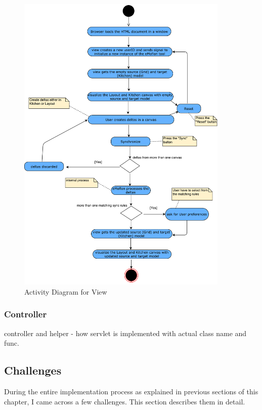 \begin{figure}
	\includegraphics[width=0.9\textwidth]{figures/Activity_Diagram_View}
	\caption{Activity Diagram for View}
	\label{fig:Activity_Diagram_View}
\end{figure}

\subsubsection{Controller}\label{subsubsec:imple_controller}
controller and helper - how servlet is implemented with actual class name and func.

\subsection{Challenges}\label{subsec:implechallenges}
During the entire implementation process as explained in previous sections of this chapter, I came across a few challenges. This section describes them in detail.

